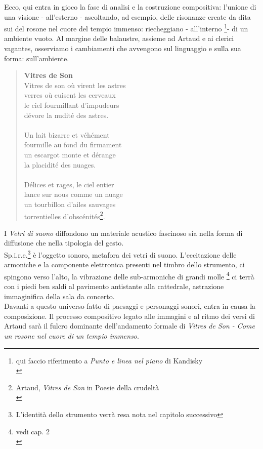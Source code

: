 Ecco, qui entra in gioco la fase di analisi e la costruzione compositiva: l'unione di una visione - all'esterno - ascoltando, ad esempio, delle risonanze create da dita sui del rosone nel cuore del tempio immenso: riecheggiano - all'interno \footnote{qui faccio riferimento a \textit{Punto e linea nel piano} di Kandisky \\}- di un ambiente vuoto.
Al margine delle balaustre, assieme ad Artaud e ai clerici vagantes, osserviamo i cambiamenti che avvengono sul linguaggio e sulla sua forma: sull'ambiente. \\
\begin{quotation}
\textbf{Vitres de Son} \\
Vitres de son où virent les astres \\
verres où cuisent les cerveaux \\
le ciel fourmillant d'impudeurs \\
dévore la nudité des astres. \\ \\
Un lait bizarre et véhément \\
fourmille au fond du firmament \\
un escargot monte et dérange \\
la placidité des nuages. \\ \\
Délices et rages, le ciel entier \\
lance sur nous comme un nuage \\
un tourbillon d'ailes sauvages \\
torrentielles d'obscénités\footnote{Artaud, \textit{Vitres de Son} in Poesie della crudeltà \\}. \\
\end{quotation}
I \textit{Vetri di suono} diffondono un materiale acustico fascinoso sia nella forma di diffusione che nella tipologia del gesto. \\
Sp.i.r.e.\footnote{L'identità dello strumento verrà resa nota nel capitolo successivo} è l'oggetto sonoro, metafora dei vetri di suono. L'eccitazione delle armoniche e la componente elettronica presenti nel timbro dello strumento, ci spingono verso l'alto, la vibrazione delle sub-armoniche di grandi molle \footnote{vedi cap. 2 \\} ci terrà con i piedi ben saldi al pavimento antistante alla cattedrale, astrazione immaginifica della sala da concerto. \\
Davanti a questo universo fatto di paesaggi e personaggi sonori, entra in causa la composizione. Il processo compositivo legato alle immagini e al ritmo dei versi di Artaud sarà il fulcro dominante dell'andamento formale di \textit{Vitres de Son - Come un rosone nel cuore di un tempio immenso}.

